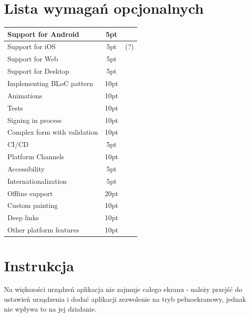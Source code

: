 \documentclass[12pt]{article}
\newcommand{\cmark}{\ding{52}}%
\newcommand{\xmark}{\ding{53}}%
\begin{document}
\section{Lista wymagań opcjonalnych}

\begin{table}[H]
\centering
\begin{tabular}{|l|c|c|}
    \hline 
    Support for Android & 5pt
    & \cmark
    \\\hline
    Support for iOS & 5pt
    & \xmark(?)
    \\\hline
    Support for Web & 5pt
    & \cmark
    \\\hline
    Support for Desktop & 5pt
    & \xmark
    \\\hline
    Implementing BLoC pattern & 10pt
    & \cmark
    \\\hline
    Animations & 10pt
    & \xmark
    \\\hline
    Tests & 10pt
    & \xmark
    \\\hline
    Signing in process & 10pt
    & \cmark
    \\\hline
    Complex form with validation & 10pt
    & \cmark
    \\\hline
    CI/CD & 5pt
    & \cmark
    \\\hline
    Platform Channels & 10pt
    & \xmark
    \\\hline
    Accessibility & 5pt
    & \xmark
    \\\hline
    Internationalization & 5pt
    & \cmark
    \\\hline
    Offline support & 20pt
    & \xmark
    \\\hline
    Custom painting & 10pt
    & \xmark
    \\\hline
    Deep links & 10pt
    & \xmark
    \\\hline
    Other platform features & 10pt
    & \xmark
    \\\hline
\end{tabular}
\end{table}














\newpage
\section{Instrukcja}
Na większości urządzeń aplikacja nie zajmuje całego ekranu - należy przejść do ustawień urządzenia i dodać aplikacji zezwolenie na tryb pełnoekranowy, jednak nie wpływa to na jej działanie.
\end{document}
